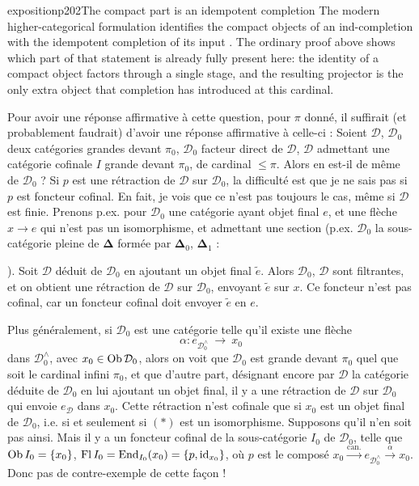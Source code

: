 \begin{dcomment}{exposition}{p202}{The compact part is an idempotent completion}
The modern higher-categorical formulation identifies the compact objects of an ind-completion with the idempotent completion of its input \citep[Lemma~5.4.2.4]{Lurie2009HTT}. The ordinary proof above shows which part of that statement is already fully present here: the identity of a compact object factors through a single stage, and the resulting projector is the only extra object that completion has introduced at this cardinal.
\end{dcomment}


Pour avoir une réponse affirmative à cette question, pour $\pi$ donné, il suffirait (et probablement faudrait) d'avoir une réponse affirmative à celle-ci : Soient $\mathcal{D}$, $\mathcal{D}_0$ deux catégories grandes devant $\pi_0$, $\mathcal{D}_0$ facteur direct de $\mathcal{D}$, $\mathcal{D}$ admettant une catégorie cofinale $I$ grande devant $\pi_0$, de cardinal $\leqslant\pi$. Alors en est-il de même de $\mathcal{D}_0$ ? Si $p$ est une rétraction de $\mathcal{D}$ sur $\mathcal{D}_0$, la difficulté est que je ne sais pas si $p$ est foncteur cofinal. En fait, je vois que
ce n'est pas toujours le cas, même si $\mathcal{D}$ est finie. Prenons p.ex. pour $\mathcal{D}_0$ une catégorie ayant objet final $e$, et une flèche $x\longrightarrow e$ qui n'est pas un isomorphisme, et admettant une section (p.ex. $\mathcal{D}_0$ la sous-catégorie pleine de $\boldsymbol{\Delta}$ formée par $\boldsymbol{\Delta}_0$, $\boldsymbol{\Delta}_1$ :  ). Soit $\mathcal{D}$ déduit de $\mathcal{D}_0$ en ajoutant un objet final $\tilde{e}$. Alors $\mathcal{D}_0$, $\mathcal{D}$ sont filtrantes, et on obtient une rétraction de $\mathcal{D}$ sur $\mathcal{D}_0$, envoyant $\tilde{e}$ sur $x$. Ce foncteur n'est pas cofinal, car un foncteur cofinal doit envoyer $\tilde{e}$ en $e$.

Plus généralement, si $\mathcal{D}_0$ est une catégorie telle qu'il existe une flèche
\[
\alpha : e_{\mathcal{D}_0^\wedge} \ \longrightarrow \ x_0 \tag*{$(*)$}
\]
dans $\mathcal{D}_0^\wedge$, avec $x_0\in\operatorname{Ob}\mathcal{D}_0$, alors on voit que $\mathcal{D}_0$ est grande devant $\pi_0$ quel que soit le cardinal infini $\pi_0$, et que d'autre part, désignant encore par $\mathcal{D}$ la catégorie déduite de $\mathcal{D}_0$ en lui ajoutant un objet final, il y a une rétraction de $\mathcal{D}$ sur $\mathcal{D}_0$ qui envoie $e_{\mathcal{D}}$ dans $x_0$. Cette rétraction n'est cofinale que si $x_0$ est un objet final de $\mathcal{D}_0$, i.e. si et seulement si $(*)$ est un isomorphisme. Supposons qu'il n'en soit pas ainsi. Mais il y a un foncteur cofinal de la sous-catégorie $I_0$ de $\mathcal{D}_0$, telle que $\operatorname{Ob} I_0=\{x_0\}$, $\operatorname{Fl} I_0=\operatorname{End}_{I_0}(x_0)=\{p,\mathrm{id}_{x_0}\}$, où $p$ est le composé $x_0\xrightarrow{\text{can.}}e_{\mathcal{D}_0^\wedge}\xrightarrow{\alpha}x_0$. Donc pas de contre-exemple de cette façon !

